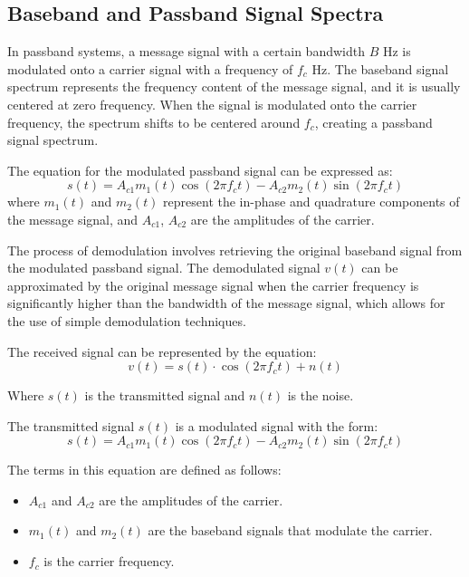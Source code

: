 \subsection*{Baseband and Passband Signal Spectra}
In passband systems, a message signal with a certain bandwidth \( B \) Hz is modulated onto a carrier signal with a frequency of \( f_c \) Hz. The baseband signal spectrum represents the frequency content of the message signal, and it is usually centered at zero frequency. When the signal is modulated onto the carrier frequency, the spectrum shifts to be centered around \( f_c \), creating a passband signal spectrum.

The equation for the modulated passband signal can be expressed as:
\begin{equation}
s(t) = A_{c1} m_1(t) \cos(2\pi f_c t) - A_{c2} m_2(t) \sin(2\pi f_c t)
\end{equation}
where \( m_1(t) \) and \( m_2(t) \) represent the in-phase and quadrature components of the message signal, and \( A_{c1} \), \( A_{c2} \) are the amplitudes of the carrier.

The process of demodulation involves retrieving the original baseband signal from the modulated passband signal. The demodulated signal \( v(t) \) can be approximated by the original message signal when the carrier frequency is significantly higher than the bandwidth of the message signal, which allows for the use of simple demodulation techniques.




The received signal can be represented by the equation:
\begin{equation}
    v(t) = s(t) \cdot \cos(2\pi f_c t) + n(t)
\end{equation}

Where \( s(t) \) is the transmitted signal and \( n(t) \) is the noise.

The transmitted signal \( s(t) \) is a modulated signal with the form:
\begin{equation}
    s(t) = A_{c1} m_1(t) \cos(2\pi f_c t) - A_{c2} m_2(t) \sin(2\pi f_c t)
\end{equation}

The terms in this equation are defined as follows:
\begin{itemize}
    \item \( A_{c1} \) and \( A_{c2} \) are the amplitudes of the carrier.
    \item \( m_1(t) \) and \( m_2(t) \) are the baseband signals that modulate the carrier.
    \item \( f_c \) is the carrier frequency.
\end{itemize}

